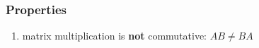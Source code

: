 \subsubsection{Properties}

\begin{enumerate}
    \item matrix multiplication is \textbf{not} commutative: $AB \neq BA$
    \hfill \cite{mfml/book/mml/Deisenroth-Faisal-Ong}

    

\end{enumerate}















